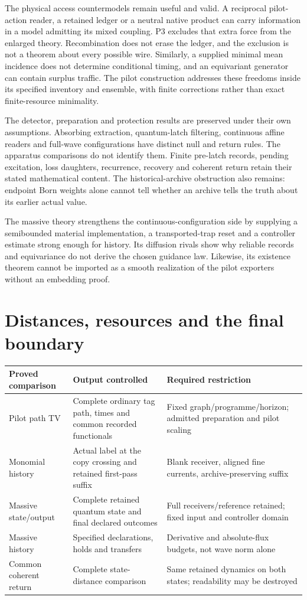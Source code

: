 \documentclass[11pt,oneside,openany]{book}
\theoremstyle{definition}
\theoremstyle{remark}\newtheorem{remark}[theorem]{Remark}
\begin{document}
The physical access countermodels remain useful and valid. A reciprocal
pilot-action reader, a retained ledger or a neutral native product can
carry information in a model admitting its mixed coupling. P3 excludes
that extra force from the enlarged theory. Recombination does not erase
the ledger, and the exclusion is not a theorem about every possible
wire. Similarly, a supplied minimal mean incidence does not determine
conditional timing, and an equivariant generator can contain surplus
traffic. The pilot construction addresses these freedoms inside its
specified inventory and ensemble, with finite corrections rather than
exact finite-resource minimality.

The detector, preparation and protection results are preserved under
their own assumptions. Absorbing extraction, quantum-latch filtering,
continuous affine readers and full-wave configurations have distinct
null and return rules. The apparatus comparisons do not identify them.
Finite pre-latch records, pending excitation, loss daughters, recurrence,
recovery and coherent return retain their stated mathematical content.
The historical-archive obstruction also remains: endpoint Born weights
alone cannot tell whether an archive tells the truth about its earlier
actual value.

The massive theory strengthens the continuous-configuration side by
supplying a semibounded material implementation, a transported-trap
reset and a controller estimate strong enough for history. Its diffusion
rivals show why reliable records and equivariance do not derive the
chosen guidance law. Likewise, its existence theorem cannot be imported
as a smooth realization of the pilot exporters without an embedding
proof.

\section{Distances, resources and the final boundary}
\begin{center}\small
\begin{tabularx}{\textwidth}{@{}>{\raggedright\arraybackslash}p{}XX@{}}\toprule
Proved comparison & Output controlled & Required restriction\\\midrule
Pilot path TV & Complete ordinary tag path, times and common recorded functionals & Fixed graph/programme/horizon; admitted preparation and pilot scaling\\
Monomial history & Actual label at the copy crossing and retained first-pass suffix & Blank receiver, aligned fine currents, archive-preserving suffix\\
Massive state/output & Complete retained quantum state and final declared outcomes & Full receivers/reference retained; fixed input and controller domain\\
Massive history & Specified declarations, holds and transfers & Derivative and absolute-flux budgets, not wave norm alone\\
Common coherent return & Complete state-distance comparison & Same retained dynamics on both states; readability may be destroyed\\\bottomrule
\end{tabularx}
\end{center}
\end{document}
